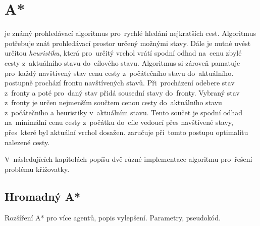\section{A*}\label{sec:a_star}


 je známý prohledávací algoritmus pro~rychlé hledání nejkratších cest.
Algoritmus potřebuje znát prohledávací prostor určený možnými stavy.
Dále je nutné uvést určitou \emph{heuristiku}, která pro~určitý vrchol vrátí
spodní odhad na~cenu zbylé cesty z~aktuálního stavu do~cílového stavu.
Algoritmus si zároveň pamatuje pro~každý navštívený stav cenu cesty z~počátečního stavu do~aktuálního.
 postupně prochází frontu navštívených stavů.
Při~procházení odebere stav z~fronty a poté pro~daný stav přidá sousední stavy do~fronty.
Vybraný stav z~fronty je určen nejmenším součtem cenou cesty
do~aktuálního stavu z~počátečního a heuristiky v~aktuálním stavu.
Tento součet je spodní odhad na~minimální cenu cesty z~počátku do~cíle vedoucí přes navštívené stavy,
přes~které byl aktuální vrchol dosažen.
 zaručuje při~tomto postupu optimalitu nalezené cesty.

V~následujících kapitolách popíšu dvě různé implementace  algoritmu pro~řešení problému křižovatky.



\subsection{Hromadný A*}\label{subsec:hromadny_a_star}

Rozšíření A* pro více agentů, popis vylepšení.
Parametry, pseudokód.


